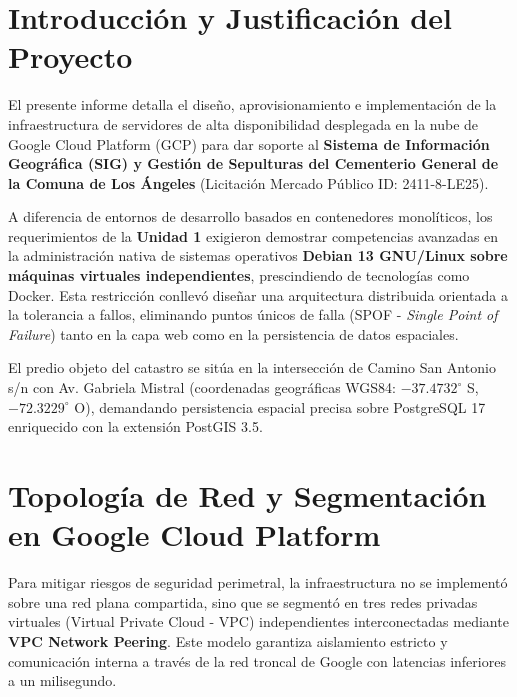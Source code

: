 \documentclass[12pt]{article}
\begin{document}

\section{Introducción y Justificación del Proyecto}

El presente informe detalla el diseño, aprovisionamiento e implementación de la infraestructura de servidores de alta disponibilidad desplegada en la nube de Google Cloud Platform (GCP) para dar soporte al \textbf{Sistema de Información Geográfica (SIG) y Gestión de Sepulturas del Cementerio General de la Comuna de Los Ángeles} (Licitación Mercado Público ID: 2411-8-LE25).

A diferencia de entornos de desarrollo basados en contenedores monolíticos, los requerimientos de la \textbf{Unidad 1} exigieron demostrar competencias avanzadas en la administración nativa de sistemas operativos \textbf{Debian 13 GNU/Linux sobre máquinas virtuales independientes}, prescindiendo de tecnologías como Docker. Esta restricción conllevó diseñar una arquitectura distribuida orientada a la tolerancia a fallos, eliminando puntos únicos de falla (SPOF - \textit{Single Point of Failure}) tanto en la capa web como en la persistencia de datos espaciales.

El predio objeto del catastro se sitúa en la intersección de Camino San Antonio s/n con Av. Gabriela Mistral (coordenadas geográficas WGS84: $-37.4732^{\circ}$ S, $-72.3229^{\circ}$ O), demandando persistencia espacial precisa sobre PostgreSQL 17 enriquecido con la extensión PostGIS 3.5.


\section{Topología de Red y Segmentación en Google Cloud Platform}

Para mitigar riesgos de seguridad perimetral, la infraestructura no se implementó sobre una red plana compartida, sino que se segmentó en tres redes privadas virtuales (Virtual Private Cloud - VPC) independientes interconectadas mediante \textbf{VPC Network Peering}. Este modelo garantiza aislamiento estricto y comunicación interna a través de la red troncal de Google con latencias inferiores a un milisegundo.
\end{document}
